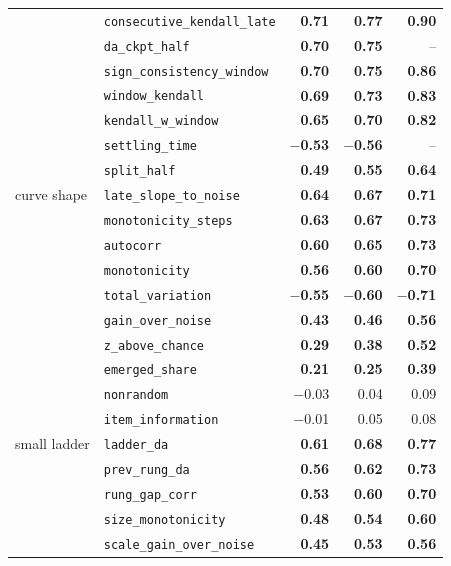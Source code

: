 \begin{table}[h]
\begin{tabular}{@{}llrrr@{}}
 & \texttt{consecutive\_kendall\_late} & \textbf{0.71} & \textbf{0.77} & \textbf{0.90} \\
 & \texttt{da\_ckpt\_half} & \textbf{0.70} & \textbf{0.75} & -- \\
 & \texttt{sign\_consistency\_window} & \textbf{0.70} & \textbf{0.75} & \textbf{0.86} \\
 & \texttt{window\_kendall} & \textbf{0.69} & \textbf{0.73} & \textbf{0.83} \\
 & \texttt{kendall\_w\_window} & \textbf{0.65} & \textbf{0.70} & \textbf{0.82} \\
 & \texttt{settling\_time} & \textbf{$-$0.53} & \textbf{$-$0.56} & -- \\
 & \texttt{split\_half} & \textbf{0.49} & \textbf{0.55} & \textbf{0.64} \\
\midrule
curve shape & \texttt{late\_slope\_to\_noise} & \textbf{0.64} & \textbf{0.67} & \textbf{0.71} \\
 & \texttt{monotonicity\_steps} & \textbf{0.63} & \textbf{0.67} & \textbf{0.73} \\
 & \texttt{autocorr} & \textbf{0.60} & \textbf{0.65} & \textbf{0.73} \\
 & \texttt{monotonicity} & \textbf{0.56} & \textbf{0.60} & \textbf{0.70} \\
 & \texttt{total\_variation} & \textbf{$-$0.55} & \textbf{$-$0.60} & \textbf{$-$0.71} \\
 & \texttt{gain\_over\_noise} & \textbf{0.43} & \textbf{0.46} & \textbf{0.56} \\
 & \texttt{z\_above\_chance} & \textbf{0.29} & \textbf{0.38} & \textbf{0.52} \\
 & \texttt{emerged\_share} & \textbf{0.21} & \textbf{0.25} & \textbf{0.39} \\
 & \texttt{nonrandom} & $-$0.03 & 0.04 & 0.09 \\
 & \texttt{item\_information} & $-$0.01 & 0.05 & 0.08 \\
\midrule
small ladder & \texttt{ladder\_da} & \textbf{0.61} & \textbf{0.68} & \textbf{0.77} \\
 & \texttt{prev\_rung\_da} & \textbf{0.56} & \textbf{0.62} & \textbf{0.73} \\
 & \texttt{rung\_gap\_corr} & \textbf{0.53} & \textbf{0.60} & \textbf{0.70} \\
 & \texttt{size\_monotonicity} & \textbf{0.48} & \textbf{0.54} & \textbf{0.60} \\
 & \texttt{scale\_gain\_over\_noise} & \textbf{0.45} & \textbf{0.53} & \textbf{0.56} \\

\end{tabular}
\end{table}
